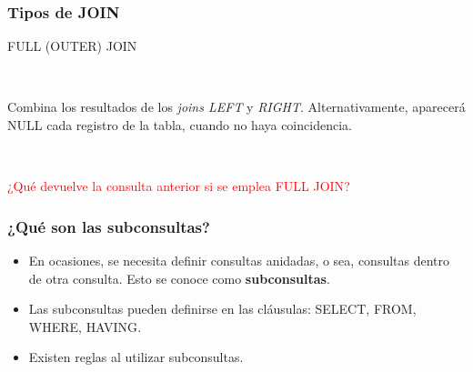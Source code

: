 
\begin{frame}[fragile]
	
	\frametitle{Tipos de JOIN}
	
	\begin{center}
	
		\textcolor{codepurple}{FULL (OUTER) JOIN}
		
		\ 
		
		Combina los resultados de los \emph{joins LEFT} y \emph{RIGHT}. Alternativamente, aparecerá \textcolor{codepurple}{NULL} cada registro de la tabla, cuando no haya coincidencia.		
		
		\begin{venndiagram2sets}[
			labelA={ }, labelOnlyA={Tabla1}, 
			labelB={ }, labelOnlyB={Tabla2}, 
			showframe=false]
			\fillA
			\fillB
		\end{venndiagram2sets}
	
	\end{center}
	
	\pause
	
	\ 
	
	\textcolor{red}{¿Qué devuelve la consulta anterior si se emplea \textcolor{codepurple}{FULL JOIN}?}
		
\end{frame}


\begin{frame}[fragile]
	
	\frametitle{¿Qué son las subconsultas?}
	
	\begin{itemize}
		
		\item En ocasiones, se necesita definir consultas anidadas, o sea, consultas dentro de otra consulta. Esto se conoce como \textbf{subconsultas}. 
		
		\item Las subconsultas pueden definirse en las cláusulas: \textcolor{codepurple}{SELECT}, \textcolor{codepurple}{FROM}, \textcolor{codepurple}{WHERE}, \textcolor{codepurple}{HAVING}.
		
		\item Existen reglas al utilizar subconsultas.
		
	\end{itemize}
		
\end{frame}

